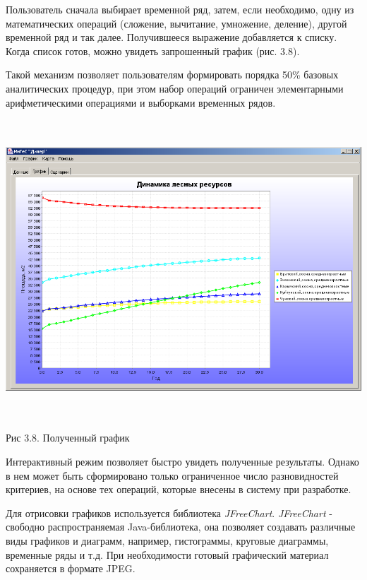 \documentclass{article}
\begin{document}
Пользователь сначала выбирает временной ряд, 
затем, если необходимо, одну из математических 
операций (сложение, вычитание, умножение, деление), 
другой временной ряд и так далее. Получившееся 
выражение добавляется к списку. Когда список 
готов, можно увидеть запрошенный график (рис. 
3.8).

Такой механизм позволяет пользователям формировать 
порядка 50\% базовых аналитических процедур, 
при этом набор операций ограничен элементарными 
арифметическими операциями и выборками временных 
рядов.

\includegraphics[width=463pt, height=317pt, keepaspectratio=true]{asyaDisser9_3-fig005.png}

\begin{center}
Рис 3.8. Полученный график
\end{center}

Интерактивный режим позволяет быстро увидеть 
полученные результаты. Однако в нем может быть 
сформировано только ограниченное число разновидностей 
критериев, на основе тех операций, которые внесены 
в систему при разработке.

Для отрисовки графиков используется библиотека 
\textit{JFreeChart}. \textit{JFreeChart} - свободно распространяемая 
Java-библиотека, она позволяет создавать различные 
виды графиков и диаграмм, например, гистограммы, 
круговые диаграммы, временные ряды и т.д. При 
необходимости готовый графический материал 
сохраняется в формате JPEG.
\end{document}
